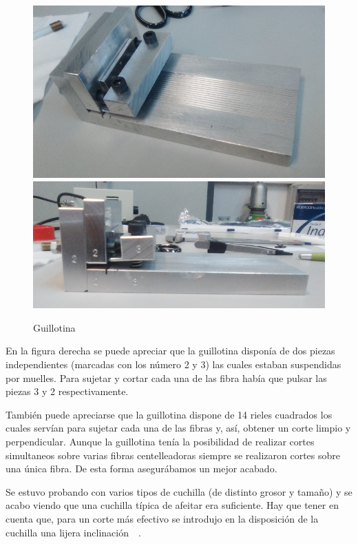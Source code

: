 \begin{figure}[htb]
\centering
{
\includegraphics[scale=0.3]{Guillotina1.png} 
}
{
\includegraphics[scale=0.3]{Guillotina2.png} 
}
\caption{Guillotina\label{Guillotina}}
\end{figure} 

En la figura derecha se puede apreciar que la guillotina disponía de dos piezas independientes (marcadas con los número 2 y 3) las cuales estaban suspendidas por muelles. Para sujetar y cortar cada una de las fibra había que pulsar las piezas 3 y 2 respectivamente. 

También puede apreciarse que la guillotina dispone de 14 rieles cuadrados los cuales servían para sujetar cada una de las fibras y, así, obtener un corte limpio y perpendicular. Aunque la guillotina tenía la posibilidad de realizar cortes simultaneos sobre varias fibras centelleadoras siempre se realizaron cortes sobre una única fibra. De esta forma asegurábamos un mejor acabado.

Se estuvo probando con varios tipos de cuchilla (de distinto grosor y tamaño) y se acabo viendo que una cuchilla típica de afeitar era suficiente. Hay que tener en cuenta que, para un corte más efectivo se introdujo en la disposición de la cuchilla una lijera inclinación~\cite{Alberto}~\cite{anguloytiempo}. 

